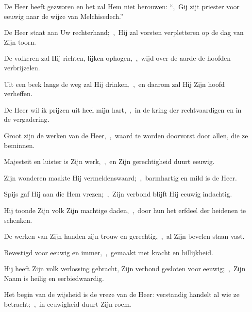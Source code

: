 \documentclass[12pt,twoside,a5paper]{article}
\begin{document}

\begin{halfparskip}
  De Heer heeft gezworen en het zal Hem niet berouwen: ``\sep\ Gij zijt priester voor eeuwig naar de wijze van Melchisedech.''
\end{halfparskip}


\begin{halfparskip}
  De Heer staat aan Uw rechterhand;~\sep\ Hij zal vorsten verpletteren op de dag van Zijn toorn.

  De volkeren zal Hij richten, lijken ophogen,~\sep\ wijd over de aarde de hoofden verbrijzelen.

  Uit een beek langs de weg zal Hij drinken,~\sep\ en daarom zal Hij Zijn hoofd verheffen.
\end{halfparskip}




\begin{halfparskip}
  De Heer wil ik prijzen uit heel mijn hart,~\sep\ in de kring der rechtvaardigen en in de vergadering.


  Groot zijn de werken van de Heer,~\sep\ waard te worden doorvorst door allen, die ze beminnen.
\end{halfparskip}


\begin{halfparskip}
  Majesteit en luister is Zijn werk,~\sep\ en Zijn gerechtigheid duurt eeuwig.

  Zijn wonderen maakte Hij vermeldenswaard;~\sep\ barmhartig en mild is de Heer.

  Spijs gaf Hij aan die Hem vrezen;~\sep\ Zijn verbond blijft Hij eeuwig indachtig.

  Hij toonde Zijn volk Zijn machtige daden,~\sep\ door hun het erfdeel der heidenen te schenken.
\end{halfparskip}


\begin{halfparskip}
  De werken van Zijn handen zijn trouw en gerechtig,~\sep\ al Zijn bevelen staan vast.

  Bevestigd voor eeuwig en immer,~\sep\ gemaakt met kracht en billijkheid.

  Hij heeft Zijn volk verlossing gebracht, Zijn verbond gesloten voor eeuwig;~\sep\ Zijn Naam is heilig en eerbiedwaardig.

  Het begin van de wijsheid is de vreze van de Heer: verstandig handelt al wie ze betracht;~\sep\ in eeuwigheid duurt Zijn roem.
\end{halfparskip}
\end{document}
